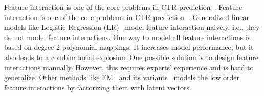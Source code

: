 \documentclass[conference]{IEEEtran}
\begin{document}
Feature interaction is one of the core problems in CTR prediction~\cite{FNN,PNN16,PNN19,DeepFM,AutoFeature,AutoFis,CAN}. Feature interaction is one of the core problems in CTR prediction~\cite{FNN,PNN16,PNN19,DeepFM,AutoFeature,AutoFis,CAN}. Generalized linear models like Logistic Regression (LR)~\cite{LR,GBDT} model feature interaction naively, i.e., they do not model feature interactions. One way to model all feature interactions is based on degree-2 polynomial mappings\cite{Poly-2}. It increases model performance, but it also leads to a combinatorial explosion. One possible solution is to design feature interactions manually. However, this requires experts' experience and is hard to generalize. Other methods like FM~\cite{FM} and its variants~\cite{FwFM,FFM} models the low order feature interactions by factorizing them with latent vectors.
\end{document}
